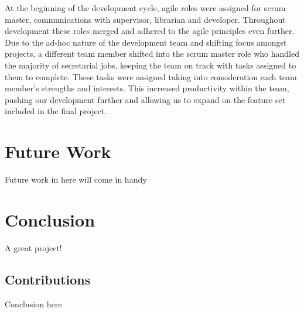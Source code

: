 \documentclass{l3proj}
\begin{document}
At the beginning of the development cycle, agile roles were assigned for scrum
master, communications with supervisor, librarian and developer. Throughout
development these roles merged and adhered to the agile principles even further.
Due to the ad-hoc nature of the development team and shifting focus amongst
projects, a different team member shifted into the scrum master role who handled
the majority of secretarial jobs, keeping the team on track with tasks assigned
to them to complete. These tasks were assigned taking into consideration each
team member’s strengths and interests. This increased productivity within the
team, pushing our development further and allowing us to expand on the feature
set included in the final project.

\chapter{Future Work}
\label{Future Work}

Future work in here will come in handy

\chapter{Conclusion}

A great project!

\section{Contributions}

Conclusion here



\end{document}
